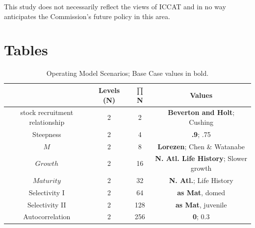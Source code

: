 \documentclass[%
nonumbib,      %
%
]{nrc1}                          %
\begin{document}
This study does not necessarily reflect the views of ICCAT and in no way anticipates the Commission's future policy in this area. 

\newpage\clearpage




\newpage\clearpage
\section*{Tables}
\begin{table}
\label{tab:grid}
\caption{Operating Model Scenarios; Base Case values in bold.}  
\begin{center}
\label{tab:datasumm}
\begin{tabular}{|cccc|}
\hline
			& {\tiny Levels (N)} & {\tiny $\prod$ N} & {\tiny Values} \\ %
\hline\hline
{\tiny stock recruitment relationship} 		& {\tiny 2} 	 & {\tiny   2}  & {\tiny  \textbf{Beverton and Holt}; Cushing}     \\%
{\tiny Steepness}	& {\tiny 2} 	 & {\tiny   4}  & {\tiny  \textbf{.9}; .75}                        \\%
{\tiny $M$} 		& {\tiny 2} 	 & {\tiny   8}  & {\tiny  \textbf{Lorezen}; Chen \& Watanabe} 	   \\%
{\tiny $Growth$} 	& {\tiny 2} 	 & {\tiny  16}  & {\tiny  \textbf{N. Atl. Life History}; Slower growth}\\%
{\tiny $Maturity$} 	& {\tiny 2} 	 & {\tiny  32}  & {\tiny  \textbf{N. Atl.}; Life History}      \\%
{\tiny Selectivity I}	& {\tiny 2} 	 & {\tiny  64}  & {\tiny  \textbf{as Mat}, domed}      		   \\%
{\tiny Selectivity II}	& {\tiny 2} 	 & {\tiny 128}  & {\tiny  \textbf{as Mat}, juvenile}   		   \\%
{\tiny Autocorrelation}	& {\tiny 2} 	 & {\tiny 256}  & {\tiny  \textbf{0}; 0.3}                        \\%

\end{tabular}
\end{center}
\end{table}
\end{document}
